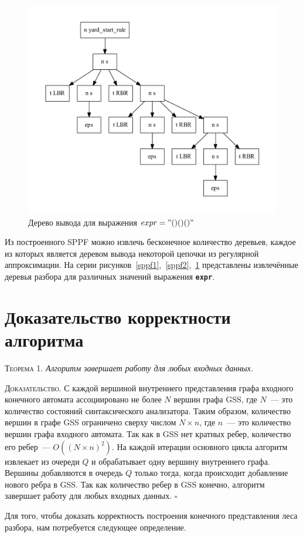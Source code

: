 \begin{figure}[!h]
 \centering
 \includegraphics[width=.7\textwidth]{pics/sppf3.pdf}
 \caption{Дерево вывода для выражения $expr="()()()"$}
 \label{sppf3}
\end{figure}

Из построенного SPPF можно извлечь бесконечное количество деревьев, каждое из которых является деревом вывода некоторой цепочки из регулярной аппроксимации. На серии рисунков~\ref{sppf1},~\ref{sppf2},~\ref{sppf3} представлены извлечённые деревья разбора для различных значений выражения \textbf{\texttt{expr}}.  


\section{Доказательство корректности алгоритма}

\textsc{Теорема 1.} 
\textit{Алгоритм завершает работу для любых входных данных.}

\textsc{Доказательство.}
С каждой вершиной внутреннего представления графа входного конечного автомата ассоциировано не более $N$ вершин графа GSS, где $N$~--- это количество состояний синтаксического анализатора. Таким образом, количество вершин в графе GSS ограничено сверху числом $N \times n$, где $n$~--- это количество вершин графа входного автомата. Так как в GSS нет кратных ребер, количество его ребер~--- $O((N \times n)^{2})$. На каждой итерации основного цикла алгоритм извлекает из очереди $Q$ и обрабатывает одну вершину внутреннего графа. Вершины добавляются в очередь $Q$ только тогда, когда происходит добавление нового ребра в GSS. Так как количество ребер в GSS конечно, алгоритм завершает работу для любых входных данных. $\square$

Для того, чтобы доказать корректность построения конечного представления леса разбора, нам потребуется следующее определение. 

